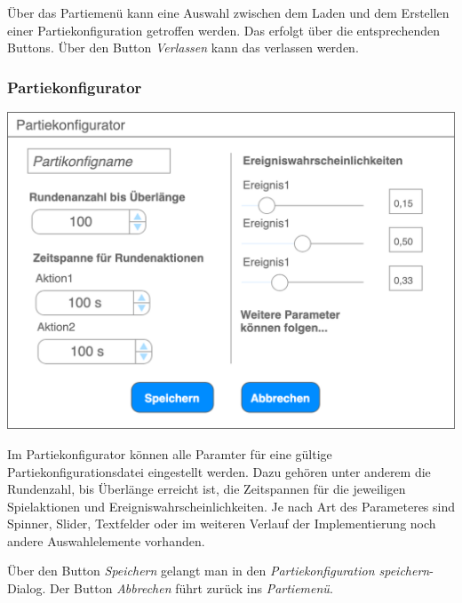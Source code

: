 \documentclass[a4paper,12pt,
headsepline,           %
oneside,               %
pointlessnumbers,      %
bibtotoc,              %
]{scrartcl}
\begin{document}
	Über das Partiemenü kann eine Auswahl zwischen dem Laden und dem Erstellen einer Partiekonfiguration getroffen werden. Das erfolgt über die entsprechenden Buttons. Über den Button \textit{Verlassen} kann das  verlassen werden.
	
	\subsubsection{Partiekonfigurator}
	
	\includegraphics[scale=0.4]{images/partiekonfigurator}
	
	Im Partiekonfigurator können alle Paramter für eine gültige Partiekonfigurationsdatei eingestellt werden. Dazu gehören unter anderem die Rundenzahl, bis Überlänge erreicht ist, die Zeitspannen für die jeweiligen Spielaktionen und Ereigniswahrscheinlichkeiten. Je nach Art des Parameteres sind Spinner, Slider, Textfelder oder im weiteren Verlauf der Implementierung noch andere Auswahlelemente vorhanden.
	
	Über den Button \textit{Speichern} gelangt man in den \textit{Partiekonfiguration speichern}-Dialog. Der Button \textit{Abbrechen} führt zurück ins \textit{Partiemenü}.
	
   
\end{document}
